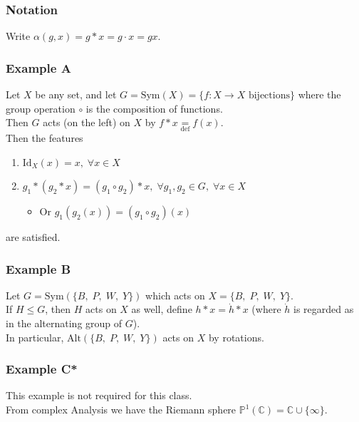 \documentclass[11pt]{article}
\newcommand{\0}{\emptyset}
\newcommand{\C}{\mathbb{C}}
\begin{document}
\subsubsection*{Notation}
\label{sec:org4bf0d04}
Write \(\alpha(g,x)=g*x=g\cdot x=gx\).\\[0pt]
\subsubsection*{Example A}
\label{sec:org60ab379}
Let \(X\) be any set, and let \(G=\text{Sym}(X) = \{f:X\to X\text{ bijections}\}\) where the group operation \(\circ\) is the composition of functions.\\[0pt]
Then \(G\) acts (on the left) on \(X\) by \(f*x\underset{\text{def}}{=}f(x)\).\\[0pt]
Then the features\\[0pt]
\begin{enumerate}
\item \(\text{Id}_{X}(x)=x,\;\forall x\in X\)\\[0pt]
\item \(g_{1}*(g_{2}*x)=(g_{1}\circ g_{2})*x,\;\forall g_{1},g_{2}\in G,\;\forall x\in X\)\\[0pt]
\begin{itemize}
\item Or \(g_{1}(g_{2}(x))=(g_{1}\circ g_{2})(x)\)\\[0pt]
\end{itemize}
\end{enumerate}
are satisfied.\\[0pt]
\subsubsection*{Example B}
\label{sec:org884224d}
Let \(G=\text{Sym}(\{B,\;P,\;W,\;Y\})\) which acts on \(X=\{B,\;P,\;W,\;Y\}\).\\[0pt]
If \(H\leq G\), then \(H\) acts on \(X\) as well, define \(h*x=\dot{h}*x\) (where \(\dot{h}\) is regarded as in the alternating group of \(G\)).\\[0pt]
In particular, \(\text{Alt}(\{B,\;P,\;W,\;Y\})\) acts on \(X\) by rotations.\\[0pt]
\subsubsection*{Example C*}
\label{sec:org3cba48c}
This example is not required for this class.\\[0pt]
From complex Analysis we have the Riemann sphere \(\mathbb{P}^{1}(\C)=\C\cup\{\infty\}\).\\[0pt]
\end{document}
